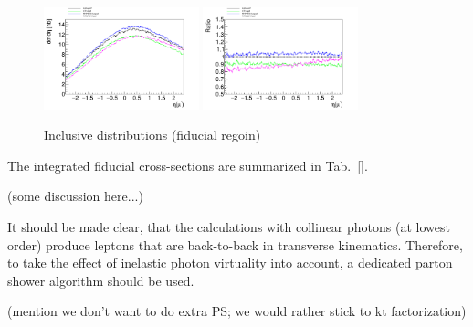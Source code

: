 \begin{figure}[h!]
\includegraphics[width=0.4\textwidth]{figures/etal_inc_cut.pdf}
\includegraphics[width=0.4\textwidth]{figures/Ratioetal_inc_cut.pdf}
\caption{Inclusive distributions (fiducial regoin)}
\label{fig:inc_cut}
\end{figure}

The integrated fiducial cross-sections are summarized in Tab.~\ref{}.

(some discussion here...)

It should be made clear, that the calculations with collinear photons (at lowest order) produce leptons that are back-to-back in transverse kinematics. Therefore, to take the effect of inelastic photon virtuality into account, a dedicated parton shower algorithm should be used.

(mention we don't want to do extra PS; we would rather stick to kt factorization)
